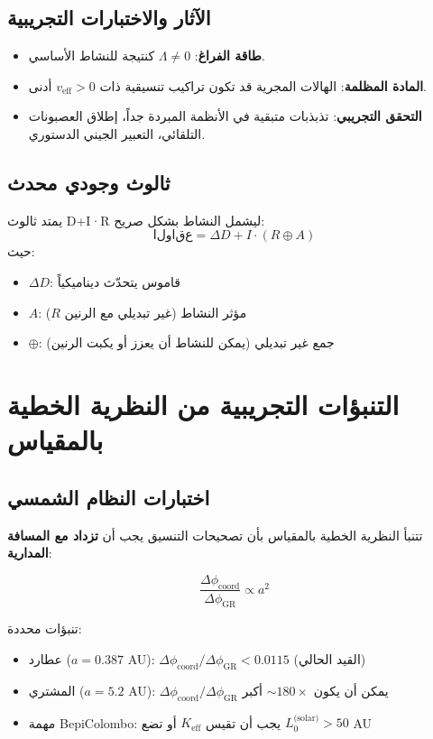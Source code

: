 \documentclass[11pt,a4paper]{article}
\begin{document}
	\subsection{الآثار والاختبارات التجريبية}
	
	\begin{itemize}
		\item \textbf{طاقة الفراغ}: $\Lambda \neq 0$ كنتيجة للنشاط الأساسي.
		\item \textbf{المادة المظلمة}: الهالات المجرية قد تكون تراكيب تنسيقية ذات $v_{\mathrm{eff}} > 0$ أدنى.
		\item \textbf{التحقق التجريبي}: تذبذبات متبقية في الأنظمة المبردة جداً، إطلاق العصبونات التلقائي، التعبير الجيني الدستوري.
	\end{itemize}
	
	\subsection{ثالوث وجودي محدث}
	
	يمتد ثالوث D+I·R ليشمل النشاط بشكل صريح:
	\[
	\boxed{\mathrm{الواقع} = \Delta D + I \cdot (R \oplus A)}
	\]
	حيث:
	\begin{itemize}
		\item $\Delta D$: قاموس يتحدّث ديناميكياً
		\item $A$: مؤثر النشاط (غير تبديلي مع الرنين $R$)
		\item $\oplus$: جمع غير تبديلي (يمكن للنشاط أن يعزز أو يكبت الرنين)
	\end{itemize}
	
	\section{التنبؤات التجريبية من النظرية الخطية بالمقياس}
	\label{sec:scale-predictions}
	
	\subsection{اختبارات النظام الشمسي}
	
	تتنبأ النظرية الخطية بالمقياس بأن تصحيحات التنسيق يجب أن \textbf{تزداد مع المسافة المدارية}:
	
	\begin{equation}
		\frac{\Delta\phi_{\text{coord}}}{\Delta\phi_{\text{GR}}} \propto a^2
	\end{equation}
	
	تنبؤات محددة:
	\begin{itemize}
		\item عطارد ($a = 0.387$ AU): $\Delta\phi_{\text{coord}}/\Delta\phi_{\text{GR}} < 0.0115$ (القيد الحالي)
		\item المشتري ($a = 5.2$ AU): $\Delta\phi_{\text{coord}}/\Delta\phi_{\text{GR}}$ يمكن أن يكون $\sim 180\times$ أكبر
		\item مهمة BepiColombo: يجب أن تقيس $K_{\mathrm{eff}}$ أو تضع $L_0^{\text{(solar)}} > 50$ AU
	\end{itemize}
	
\end{document}
